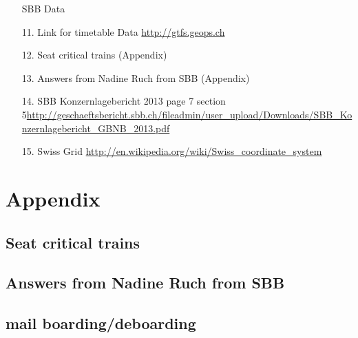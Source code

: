 \documentclass[11pt]{article}
\begin{document}
\begin{itemize}
SBB Data\newline

\item[11.] Link for timetable Data \url{http://gtfs.geops.ch}\newline
\item[12.] Seat critical trains (Appendix)\newline
\item[13.] Answers from Nadine Ruch from SBB (Appendix)\newline

\item[14.] SBB Konzernlagebericht 2013 page 7 section 5\url{http://geschaeftsbericht.sbb.ch/fileadmin/user_upload/Downloads/SBB_Konzernlagebericht_GBNB_2013.pdf}\newline

\item[15.]Swiss Grid \url{http://en.wikipedia.org/wiki/Swiss_coordinate_system}
\end{itemize}

\newpage

\section{Appendix}

\subsection{Seat critical trains}


\begin{figure}[h]

\end{figure}
\newpage
\subsection{Answers from Nadine Ruch from SBB}
\begin{figure}[h]

\end{figure}

\newpage

\subsection{mail boarding/deboarding}

\begin{figure}[h]

\end{figure}
\end{document}
